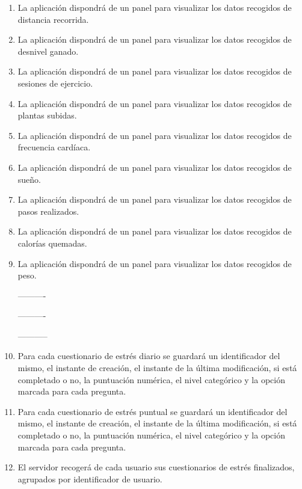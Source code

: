 \begin{enumerate}[label=\textbf{\texttt{RF-\arabic*}}]
            \item La aplicación dispondrá de un panel para visualizar los datos recogidos de distancia recorrida.
            \item La aplicación dispondrá de un panel para visualizar los datos recogidos de desnivel ganado.
            \item La aplicación dispondrá de un panel para visualizar los datos recogidos de sesiones de ejercicio.
            \item La aplicación dispondrá de un panel para visualizar los datos recogidos de plantas subidas.
            \item La aplicación dispondrá de un panel para visualizar los datos recogidos de frecuencia cardíaca.
            \item La aplicación dispondrá de un panel para visualizar los datos recogidos de sueño.
            \item La aplicación dispondrá de un panel para visualizar los datos recogidos de pasos realizados.
            \item La aplicación dispondrá de un panel para visualizar los datos recogidos de calorías quemadas.
            \item La aplicación dispondrá de un panel para visualizar los datos recogidos de peso.

            ----------

            ----------

            -----------
            \item Para cada cuestionario de estrés diario se guardará un identificador del mismo, el instante de creación, el instante de la última modificación, si está completado o no, la puntuación numérica, el nivel categórico y la opción marcada para cada pregunta.
            \item Para cada cuestionario de estrés puntual se guardará un identificador del mismo, el instante de creación, el instante de la última modificación, si está completado o no, la puntuación numérica, el nivel categórico y la opción marcada para cada pregunta.
            \item El servidor recogerá de cada usuario sus cuestionarios de estrés finalizados, agrupados por identificador de usuario.


\end{enumerate}
